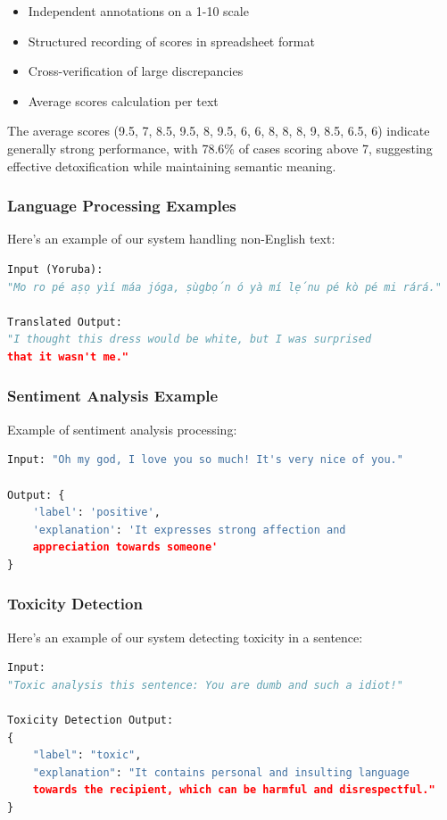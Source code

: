 \documentclass[11pt]{article}
\begin{document}
\begin{itemize}
    \item Independent annotations on a 1-10 scale
    \item Structured recording of scores in spreadsheet format
    \item Cross-verification of large discrepancies
    \item Average scores calculation per text
\end{itemize}

The average scores (9.5, 7, 8.5, 9.5, 8, 9.5, 6, 6, 8, 8, 8, 9, 8.5, 6.5, 6) indicate generally strong performance, with 78.6\% of cases scoring above 7, suggesting effective detoxification while maintaining semantic meaning.

\subsubsection{Language Processing Examples}
Here's an example of our system handling non-English text:

\begin{lstlisting}[language=Python]
Input (Yoruba): 
"Mo ro pé aṣọ yìí máa jóga, ṣùgbọ́n ó yà mí lẹ́nu pé kò pé mi rárá."

Translated Output: 
"I thought this dress would be white, but I was surprised 
that it wasn't me."
\end{lstlisting}

\subsubsection{Sentiment Analysis Example}
Example of sentiment analysis processing:

\begin{lstlisting}[language=Python]
Input: "Oh my god, I love you so much! It's very nice of you."

Output: {
    'label': 'positive',
    'explanation': 'It expresses strong affection and 
    appreciation towards someone'
}
\end{lstlisting}

\subsubsection{Toxicity Detection}  
Here's an example of our system detecting toxicity in a sentence:

\begin{lstlisting}[language=Python]
Input: 
"Toxic analysis this sentence: You are dumb and such a idiot!"

Toxicity Detection Output: 
{
    "label": "toxic",
    "explanation": "It contains personal and insulting language 
    towards the recipient, which can be harmful and disrespectful."
}
\end{lstlisting}
\end{document}
